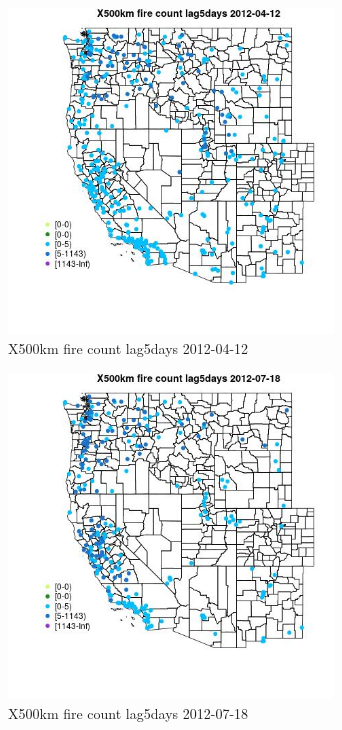 \begin{figure} 
\centering  
\includegraphics[width=0.77\textwidth]{Code_Outputs/Report_ML_input_PM25_Step4_part_e_de_duplicated_aves_compiled_2019-05-14wNAs_MapObsX500km_fire_count_lag5days2012-04-12.jpg} 
\caption{\label{fig:Report_ML_input_PM25_Step4_part_e_de_duplicated_aves_compiled_2019-05-14wNAsMapObsX500km_fire_count_lag5days2012-04-12}X500km fire count lag5days 2012-04-12} 
\end{figure} 
 

\begin{figure} 
\centering  
\includegraphics[width=0.77\textwidth]{Code_Outputs/Report_ML_input_PM25_Step4_part_e_de_duplicated_aves_compiled_2019-05-14wNAs_MapObsX500km_fire_count_lag5days2012-07-18.jpg} 
\caption{\label{fig:Report_ML_input_PM25_Step4_part_e_de_duplicated_aves_compiled_2019-05-14wNAsMapObsX500km_fire_count_lag5days2012-07-18}X500km fire count lag5days 2012-07-18} 
\end{figure} 
 

